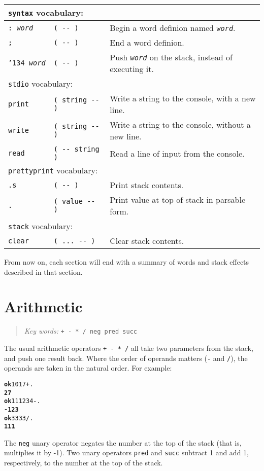 \documentclass[english]{book}
\newcommand{\ttbackslash}{\char'134}
\newcommand{\chapkeywords}[1]{%
\begin{quote}
\emph{Key words:} \texttt{#1}
\end{quote}
}
\newcommand{\wordtable}[1]{{
\begin{tabularx}{12cm}{|l l X|}
#1
\hline
\end{tabularx}}}
\newcommand{\tabvocab}[1]{
\hline
\multicolumn{3}{|l|}{
\rule[-2mm]{0mm}{6mm}
\texttt{#1} vocabulary:}
\\
\hline
}
\begin{document}
\wordtable{
\tabvocab{syntax}
\texttt{:~\emph{word}}&
\texttt{( -{}- )}&
Begin a word definion named \texttt{\emph{word}}.\\
\texttt{;}&
\texttt{( -{}- )}&
End a word definion.\\
\texttt{\ttbackslash\ \emph{word}}&
\texttt{( -{}- )}&
Push \texttt{\emph{word}} on the stack, instead of executing it.\\
\tabvocab{stdio}
\texttt{print}&
\texttt{( string -{}- )}&
Write a string to the console, with a new line.\\
\texttt{write}&
\texttt{( string -{}- )}&
Write a string to the console, without a new line.\\
\texttt{read}&
\texttt{( -{}- string )}&
Read a line of input from the console.\\
\tabvocab{prettyprint}
\texttt{.s}&
\texttt{( -{}- )}&
Print stack contents.\\
\texttt{.}&
\texttt{( value -{}- )}&
Print value at top of stack in parsable form.\\
\tabvocab{stack}
\texttt{clear}&
\texttt{( ...~-{}- )}&
Clear stack contents.\\
}

From now on, each section will end with a summary of words and stack effects described in that section.

\section{Arithmetic}

\chapkeywords{+ - {*} / neg pred succ}
\index{\texttt{+}}
\index{\texttt{-}}
\index{\texttt{*}}
\index{\texttt{/}}

The usual arithmetic operators \texttt{+ - {*} /} all take two parameters
from the stack, and push one result back. Where the order of operands
matters (\texttt{-} and \texttt{/}), the operands are taken in the natural order. For example:

\begin{alltt}
\textbf{ok} 10 17 + .
\textbf{27}
\textbf{ok} 111 234 - .
\textbf{-123}
\textbf{ok} 333 3 / .
\textbf{111}
\end{alltt}

The \texttt{neg} unary operator negates the number at the top of the stack (that is, multiplies it by -1). Two unary operators \texttt{pred} and \texttt{succ} subtract 1 and add 1, respectively, to the number at the top of the stack.
\end{document}
